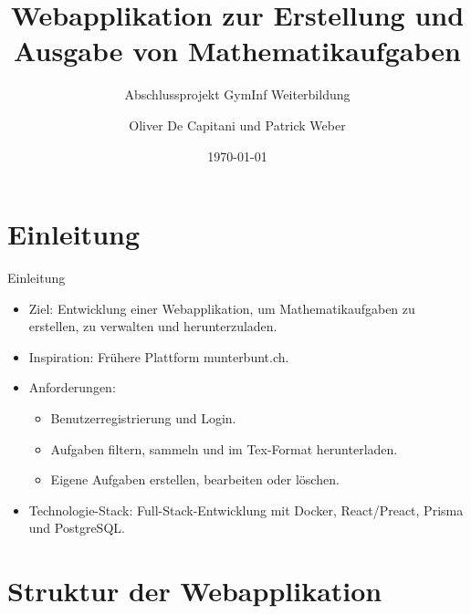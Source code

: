 \documentclass{beamer}
\title{Webapplikation zur Erstellung und Ausgabe von Mathematikaufgaben}
\subtitle{Abschlussprojekt GymInf Weiterbildung}
\author{Oliver De Capitani und Patrick Weber}
\date{\today}
\begin{document}
\frame{\titlepage}


\section{Einleitung}
\begin{frame}{Einleitung}
    \begin{itemize}
        \item<1-> Ziel: Entwicklung einer Webapplikation, um Mathematikaufgaben zu erstellen, zu verwalten und herunterzuladen.
        \item<2-> Inspiration: Frühere Plattform munterbunt.ch.
        \item<3-> Anforderungen:
        \begin{itemize}
            \item Benutzerregistrierung und Login.
            \item Aufgaben filtern, sammeln und im Tex-Format herunterladen.
            \item Eigene Aufgaben erstellen, bearbeiten oder löschen.
        \end{itemize}
        \item<4-> Technologie-Stack: Full-Stack-Entwicklung mit Docker, React/Preact, Prisma und PostgreSQL.
    \end{itemize}
\end{frame}

\section{Struktur der Webapplikation}
\end{document}
